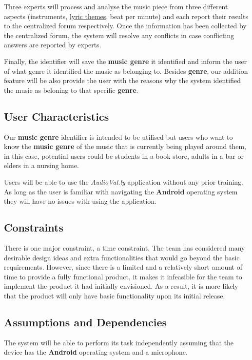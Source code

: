 \documentclass[]{article}
\begin{document}
Three experts will process and analyse the music piece from three different aspects (instruments, \underline{lyric themes}, beat per minute) and each report their results to the centralized forum respectively. Once the information has been collected by the centralized forum, the system will resolve any conflicts in case conflicting answers are reported by experts. 

Finally, the identifier will save the \textbf{music genre} it identified and inform the user of what genre it identified the music as belonging to. Besides \textbf{genre}, our addition feature will be also provide the user with the reasons why the system identified the music as beloning to that specific \textbf{genre}.


\subsection{User Characteristics}
\label{sub:user_characteristics}
Our \textbf{music genre} identifier is intended to be utilised but users who want to know the \textbf{music genre} of the music that is currently being played around them, in this case, potential users could be students in a book store, adults in a bar or elders in a nursing home.

Users will be able to use the \textit{AudioVal.ly} application without any prior training. As long as the user is familiar with navigating the \textbf{Android} operating system they will have no issues with using the application.

\subsection{Constraints}
\label{sub:constraints}
There is one major constraint, a time constraint. The team has considered many desirable design ideas and extra functionalities that would go beyond the basic requirements. However, since there is a limited and a relatively short amount of time to provide a fully functional product, it makes it infeasible for the team to implement the product it had initially envisioned. As a result, it is more likely that the product will only have basic functionality upon its initial release.

\subsection{Assumptions and Dependencies}
\label{sub:assumptions_and_dependencies}
The system will be able to perform its task independently assuming that the device has the \textbf{Android} operating system and a microphone. 
\end{document}
